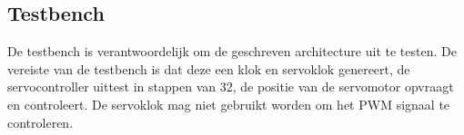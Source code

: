 \subsection{Testbench}

De testbench is verantwoordelijk om de geschreven architecture uit te testen. De vereiste van de testbench is dat deze een klok en servoklok genereert, de servocontroller uittest in stappen van 32, de positie van de servomotor opvraagt en controleert. De servoklok mag niet gebruikt worden om het PWM signaal te controleren.\\




















